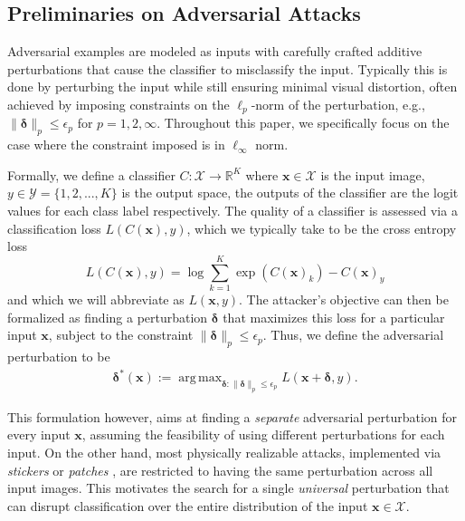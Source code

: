 \documentclass[letterpaper]{article}
\DeclareMathOperator*{\argmax}{arg\,max}
\begin{document}
	
	\subsection{Preliminaries on Adversarial Attacks}
	
	Adversarial examples are modeled as inputs with carefully crafted additive perturbations that cause the classifier to misclassify  the input. Typically this is done by perturbing the input while still ensuring minimal visual distortion, often achieved by imposing constraints on the $\ell_p$-norm of the perturbation, e.g., $\|\boldsymbol{\delta}\|_p \leq \epsilon_p$ for $p=1,2, \infty$. Throughout this paper, we specifically focus on the case where the constraint imposed is in $\ell_{\infty}$ norm.
	
	
	Formally, we define a classifier $C:\mathcal{X}\to\mathbb{R}^K$ where $\mathbf{x}\in\mathcal{X}$ is the input image, $y\in\mathcal{Y}=\{1,2,..., K\}$ is the output space, the outputs of the classifier are the logit values for each class label respectively.  The quality of a classifier is assessed via a classification loss $L(C(\mathbf{x}),y)$, which we typically take to be the cross entropy loss
	\begin{equation}
	\label{eq:cross-entropy}
	L(C(\mathbf{x}),y) = \log\sum_{k=1}^K \exp(C(\mathbf{x})_k) - C(\mathbf{x})_y
	\end{equation}
	and which we will abbreviate as $L(\mathbf{x},y)$.  The attacker's objective can then be formalized as finding a perturbation $\bm{\delta}$ that maximizes this loss for a particular input $\mathbf{x}$, subject to the constraint ${  \|\bm{\delta}\|_p \leq \epsilon_p}$. Thus, we define the adversarial perturbation to be
	\begin{align}
	\label{eq:opt_single}
	\bm{\delta}^*(\mathbf{x}) := \argmax_{\bm{\delta} :  \|\bm{\delta}\|_p \leq \epsilon_p} L(\mathbf{x}+\bm{\delta},y).
	\end{align}
	
	
	This formulation however, aims at finding  a {\emph {separate}} adversarial perturbation for every input $\mathbf{x}$, assuming the feasibility of using different perturbations for each input. On the other hand, most physically realizable attacks, implemented via \emph{stickers} or \emph{patches} \citep{brown2017adversarsial,li2019adversarial}, are restricted to having the same perturbation across all input images. This motivates the search for a single \emph{universal} perturbation that can disrupt classification over the entire distribution of the input $\mathbf{x}\in\mathcal{X}$. 
	
\end{document}
